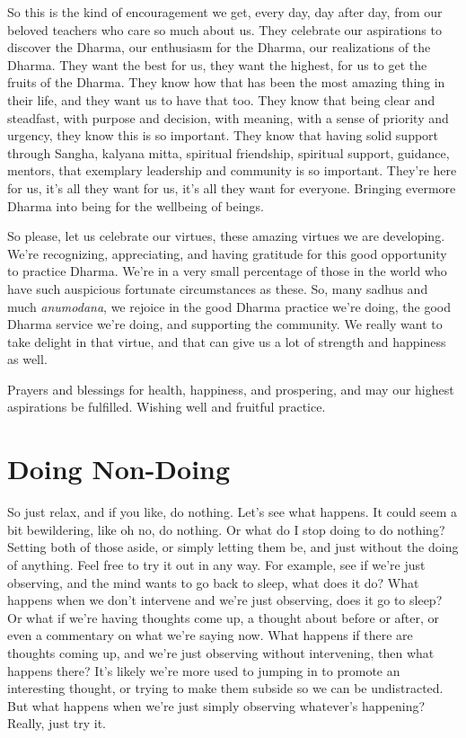 \documentclass[12pt,openany]{book}
\begin{document}
So this is the kind of encouragement we get, every day, day after day, from our beloved teachers who care so much about us. They celebrate our aspirations to discover the Dhar\-ma, our enthusiasm for the Dhar\-ma, our realizations of the Dhar\-ma. They want the best for us, they want the highest, for us to get the fruits of the Dhar\-ma. They know how that has been the most amazing thing in their life, and they want us to have that too. They know that being clear and steadfast, with purpose and decision, with meaning, with a sense of priority and urgency, they know this is so important. They know that having solid support through Sangha, kalyana mitta, spiritual friendship, spiritual support, guidance, mentors, that exemplary leadership and community is so important. They're here for us, it's all they want for us, it's all they want for everyone. Bringing evermore Dhar\-ma into being for the wellbeing of beings.

So please, let us celebrate our virtues, these amazing virtues we are developing. We're recognizing, appreciating, and having gratitude for this good opportunity to practice Dhar\-ma. We’re in a very small percentage of those in the world who have such auspicious fortunate circumstances as these. So, many sadhus and much \textit{a\-nu\-mo\-da\-na}, we rejoice in the good Dhar\-ma practice we're doing, the good Dhar\-ma service we’re doing, and supporting the community. We really want to take delight in that virtue, and that can give us a lot of strength and happiness as well.

Prayers and blessings for health, happiness, and prospering, and may our highest aspirations be fulfilled. Wishing well and fruitful practice. 

\chapter*{Doing Non-Doing}

So just relax, and if you like, do nothing. Let's see what happens. It could seem a bit bewildering, like oh no, do nothing. Or what do I stop doing to do nothing? Setting both of those aside, or simply letting them be, and just without the doing of anything. Feel free to try it out in any way. For example, see if we’re just observing, and the mind wants to go back to sleep, what does it do? What happens when we don't intervene and we’re just observing, does it go to sleep? Or what if we're having thoughts come up, a thought about before or after, or even a commentary on what we’re saying now. What happens if there are thoughts coming up, and we’re just observing without intervening, then what happens there? It's likely we’re more used to jumping in to promote an interesting thought, or trying to make them subside so we can be undistracted. But what happens when we're just simply observing whatever's happening? Really, just try it.
\end{document}

